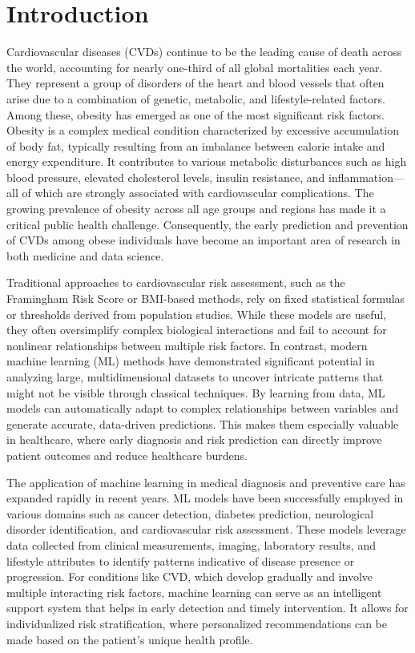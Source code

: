 \chapter{Introduction}\label{ch:introduction}


Cardiovascular diseases (CVDs) continue to be the leading cause of death across the world, accounting for nearly one-third of all global mortalities each year.
They represent a group of disorders of the heart and blood vessels that often arise due to a combination of genetic, metabolic, and lifestyle-related factors.
Among these, obesity has emerged as one of the most significant risk factors.
Obesity is a complex medical condition characterized by excessive accumulation of body fat, typically resulting from an imbalance between calorie intake and energy expenditure.
It contributes to various metabolic disturbances such as high blood pressure, elevated cholesterol levels, insulin resistance, and inflammation—all of which are strongly associated with cardiovascular complications.
The growing prevalence of obesity across all age groups and regions has made it a critical public health challenge.
Consequently, the early prediction and prevention of CVDs among obese individuals have become an important area of research in both medicine and data science.

Traditional approaches to cardiovascular risk assessment, such as the Framingham Risk Score or BMI-based methods, rely on fixed statistical formulas or thresholds derived from population studies.
While these models are useful, they often oversimplify complex biological interactions and fail to account for nonlinear relationships between multiple risk factors.
In contrast, modern machine learning (ML) methods have demonstrated significant potential in analyzing large, multidimensional datasets to uncover intricate patterns that might not be visible through classical techniques.
By learning from data, ML models can automatically adapt to complex relationships between variables and generate accurate, data-driven predictions.
This makes them especially valuable in healthcare, where early diagnosis and risk prediction can directly improve patient outcomes and reduce healthcare burdens.

The application of machine learning in medical diagnosis and preventive care has expanded rapidly in recent years.
ML models have been successfully employed in various domains such as cancer detection, diabetes prediction, neurological disorder identification, and cardiovascular risk assessment.
These models leverage data collected from clinical measurements, imaging, laboratory results, and lifestyle attributes to identify patterns indicative of disease presence or progression.
For conditions like CVD, which develop gradually and involve multiple interacting risk factors, machine learning can serve as an intelligent support system that helps in early detection and timely intervention.
It allows for individualized risk stratification, where personalized recommendations can be made based on the patient’s unique health profile.

